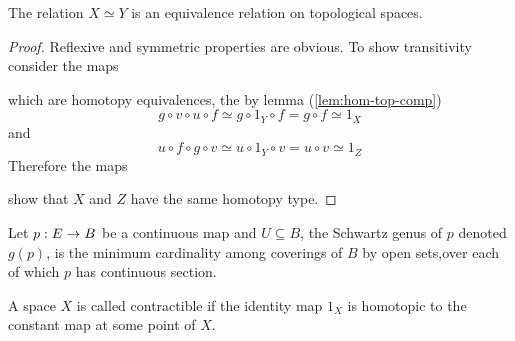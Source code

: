 \begin{lem}
    The relation $X \simeq Y$ is an equivalence relation on topological spaces.
\end{lem}

\begin{proof}
    Reflexive and symmetric properties are obvious. To show transitivity consider the maps
    \begin{center}
        \qquad
    \end{center}
    which are homotopy equivalences, the by lemma (\ref{lem:hom-top-comp})
    \[
        g \circ v \circ u \circ f \simeq g \circ 1_Y \circ f = g \circ f \simeq 1_X
    \]
    and
    \[
        u \circ f \circ g \circ v \simeq u \circ 1_Y \circ v = u \circ v \simeq 1_Z
    \]
    Therefore the maps
    \begin{center}
    \end{center}
    show that $X$ and $Z$ have the same homotopy type.
\end{proof}

\begin{defn}
    Let $p : E \rightarrow B$ be a continuous map and $U \subseteq B$, the Schwartz genus of $p$ denoted $g(p)$, is the minimum cardinality among coverings of $B$ by open sets,over each of which $p$ has continuous section.
\end{defn}

\begin{defn}
    A space $X$ is called contractible if the identity map $1_X$ is homotopic to the constant map at some point of $X$.
\end{defn}


